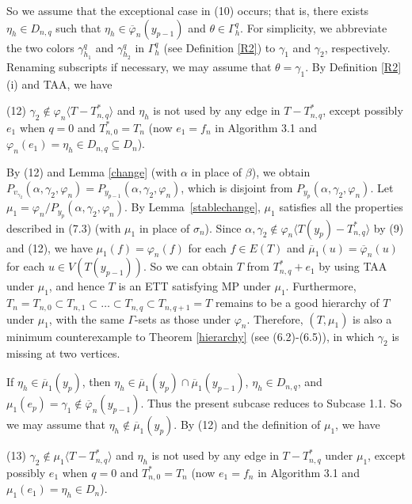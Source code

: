 \documentclass[11pt]{article}
\newcommand{\phibar}{\overline{\varphi}}
\begin{document}
So we assume that the exceptional case in (10) occurs; that is, there exists $\eta_h\in D_{n,q}$ such 
that $\eta_h \in\phibar_n(y_{p-1})$ and $\theta\in \Gamma^{q}_h$. For simplicity, we abbreviate the two colors 
$\gamma^{q}_{h_1}$ and $\gamma^{q}_{h_2}$ in $\Gamma^{q}_h$ (see Definition \ref{R2}) to $\gamma_1$ and $\gamma_2$, 
respectively. Renaming subscripts if necessary, we may assume that $\theta=\gamma_1$. By Definition \ref{R2}(i) and
TAA, we have

(12)  $\gamma_2 \notin\varphi_n \langle T-T_{n,q}^* \rangle$ and  $\eta_h$ is not used by 
any edge in $T -  T_{n,q}^*$, except possibly $e_1$ when $q=0$ and $T_{n,0}^*=T_n$ (now $e_1=f_n$ in Algorithm 3.1 
and $\varphi_n(e_1)=\eta_h \in D_{n,q} \subseteq D_n$). 

By (12) and Lemma \ref{change} (with $\alpha$ in place of $\beta$), we obtain $P_{v_{\gamma_2}}(\alpha,\gamma_{2},\varphi_n)=P_{y_{p-1}}(\alpha,\gamma_{2},
\varphi_n)$, which is disjoint from $P_{y_{p}}(\alpha,\gamma_{2},\varphi_n)$.  Let $\mu_1=\varphi_n/P_{y_{p}}(\alpha,\gamma_{2},
\varphi_n)$. By Lemma~\ref{stablechange},  $\mu_1$ satisfies all the properties described in (7.3) (with $\mu_1$ in place of
$\sigma_n$).  Since $\alpha, \gamma_2 \notin \varphi_n \langle T(y_{p})-T_{n,q}^* \rangle$ by (9) and (12), we have 
$\mu_1(f)=\varphi_n(f)$ for each $f\in E(T)$ and $\overline{\mu}_1(u)= \phibar_n(u)$ for each $u\in V(T(y_{p-1}))$. 
So we can obtain $T$ from $T_{n,q}^*+e_1$ by using TAA under $\mu_1$, and hence $T$  
is an ETT satisfying MP under $\mu_1$. Furthermore, $T_n=T_{n,0} \subset T_{n,1} \subset \ldots \subset T_{n,q} \subset T_{n,q+1}=T$ 
remains to be a good hierarchy of $T$ under $\mu_1$, with the same $\Gamma$-sets as those under $\varphi_n$. 
Therefore, $(T, \mu_1)$ is also a minimum counterexample to Theorem \ref{hierarchy} (see (6.2)-(6.5)), in which 
$\gamma_2$ is missing at two vertices.

If $\eta_h\in\overline{\mu}_1(y_{p})$, then $\eta_h \in\overline{\mu}_1(y_p)\cap\overline{\mu}_1(y_{p-1})$,
$\eta_h\in D_{n,q}$, and $\mu_1(e_p)=\gamma_{1} \notin \phibar_n(y_{p-1})$. Thus the present subcase reduces 
to Subcase 1.1. So we may assume that $\eta_h\notin\overline{\mu}_1(y_{p})$. By (12) and the definition of $\mu_1$, we have

(13) $\gamma_2 \notin\mu_1 \langle T-T_{n,q}^* \rangle$ and $\eta_h$ is not used by any edge in $T -  T_{n,q}^*$ 
under $\mu_1$, except possibly $e_1$ when $q=0$ and $T_{n,0}^*=T_n$ (now $e_1=f_n$ in Algorithm 3.1 and 
$\mu_1(e_1)=\eta_h \in D_n$). 
\end{document}
